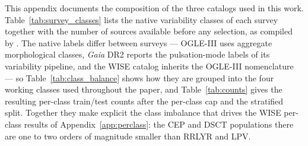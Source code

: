 \documentclass{aa}
\begin{document}
This appendix documents the composition of the three catalogs used in
this work. Table~\ref{tab:survey_classes} lists the native variability
classes of each survey together with the number of sources available
before any selection, as compiled by \citet{becker2020scalable}. The
native labels differ between surveys --- OGLE-III uses aggregate
morphological classes, \textit{Gaia} DR2 reports the pulsation-mode
labels of its variability pipeline, and the WISE catalog inherits the
OGLE-III nomenclature --- so Table~\ref{tab:class_balance} shows how they
are grouped into the four working classes used throughout the paper, and
Table~\ref{tab:counts} gives the resulting per-class train/test counts
after the per-class cap and the stratified split. Together they make
explicit the class imbalance that drives the WISE per-class results of
Appendix~\ref{app:perclass}: the CEP and DSCT populations there are one
to two orders of magnitude smaller than RRLYR and LPV.
\end{document}
